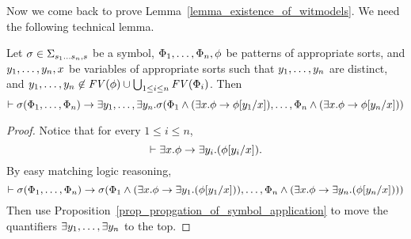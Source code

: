 \documentclass{amsart}
\begin{document}
\begin{comment}


\begin{lemma}
\label{lemma_lemma_for_proving_existence_of_witmodels}
The following pattern is provable
$$
\sigma(\varphi_1 \ddd \varphi_{i-1} , \varphi_i , \varphi_{i+1} \ddd \varphi_n) 
\imp
\exists y_i . \sigma( \varphi_1 \ddd \varphi_{i-1} ,
                      (\exists x_i . \psi \imp \psi[y_i/x_i]) \wedge \varphi_i  
                      , \varphi_{i+1} \ddd \varphi_n )
$$
if $y_i$ does not occur free in it or in $\psi$.
\end{lemma}
\begin{proof}
By standard first-order reasoning.
\end{proof}

\end{comment}

Now we come back to prove Lemma~\ref{lemma_existence_of_witmodels}.
We need the following technical lemma.

\begin{lemma}
\label{lemma_existence_of_witmodels_lemma}
Let $\sigma \in \Sigma_{s_1 \dots s_n , s}$ be a symbol,
$\Phi_1 ,\dots, \Phi_n, \phi$ be patterns 
of appropriate sorts,
and
$y_1 ,\dots, y_n,x$ be variables of appropriate sorts
such that $y_1 ,\dots, y_n$ are distinct,
and
$y_1 ,\dots, y_n \not\in
 \mathit{FV}(\phi)\cup
 \bigcup_{1 \le i \le n} 
 \mathit{FV}(\Phi_i) 
$.
Then
$$
\vdash
\sigma(\Phi_1 ,\dots, \Phi_n) \to
\exists y_1 ,\dots, \exists y_n . 
\sigma(\Phi_1 \wedge (\exists x . \phi \to \phi [y_1/x])
,\dots,   \Phi_n \wedge (\exists x . \phi \to \phi [y_n/x]))
$$
\end{lemma}
\begin{proof}
Notice that for every $1 \le i \le n$,
$$\vdash \exists x . \phi 
  \to \exists y_i . (\phi[y_i/x]).$$
By easy matching logic reasoning,
$$
\vdash
\sigma(\Phi_1 ,\dots, \Phi_n) \to
\sigma(\Phi_1 \wedge (\exists x . \phi \to \exists y_1 . (\phi[y_1/x]))
,\dots,   \Phi_n \wedge (\exists x . \phi \to \exists y_n . (\phi[y_n/x])))
$$
Then use Proposition~\ref{prop_propgation_of_symbol_application} 
to move the quantifiers
$\exists y_1 ,\dots, \exists y_n$ to the top.
\end{proof}

\existenceLemma*
\end{document}
